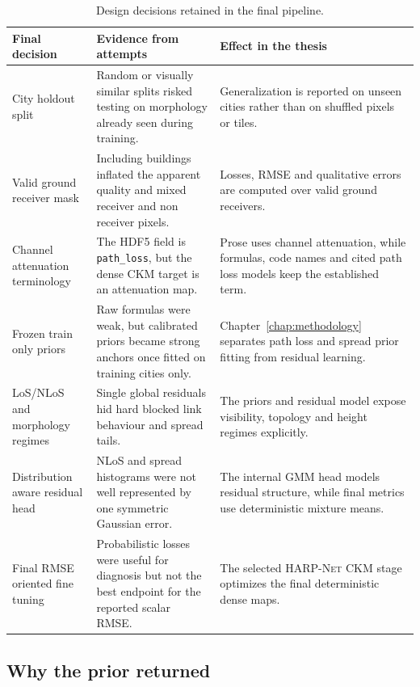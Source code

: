 \begin{table}[htbp]
\centering
\caption{Design decisions retained in the final pipeline.}
\label{tab:appendix_decision_record}
\scriptsize
\setlength{\tabcolsep}{3pt}
\begin{tabularx}{\textwidth}{p{}p{}X}
\toprule
Final decision & Evidence from attempts & Effect in the thesis \\
\midrule
City holdout split & Random or visually similar splits risked testing on morphology already seen during training. & Generalization is reported on unseen cities rather than on shuffled pixels or tiles. \\
Valid ground receiver mask & Including buildings inflated the apparent quality and mixed receiver and non receiver pixels. & Losses, RMSE and qualitative errors are computed over valid ground receivers. \\
Channel attenuation terminology & The HDF5 field is \texttt{path\_loss}, but the dense CKM target is an attenuation map. & Prose uses channel attenuation, while formulas, code names and cited path loss models keep the established term. \\
Frozen train only priors & Raw formulas were weak, but calibrated priors became strong anchors once fitted on training cities only. & Chapter~\ref{chap:methodology} separates path loss and spread prior fitting from residual learning. \\
LoS/NLoS and morphology regimes & Single global residuals hid hard blocked link behaviour and spread tails. & The priors and residual model expose visibility, topology and height regimes explicitly. \\
Distribution aware residual head & NLoS and spread histograms were not well represented by one symmetric Gaussian error. & The internal GMM head models residual structure, while final metrics use deterministic mixture means. \\
Final RMSE oriented fine tuning & Probabilistic losses were useful for diagnosis but not the best endpoint for the reported scalar RMSE. & The selected \textsc{HARP-Net CKM} stage optimizes the final deterministic dense maps. \\
\bottomrule
\end{tabularx}
\end{table}

\subsection{Why the prior returned}

